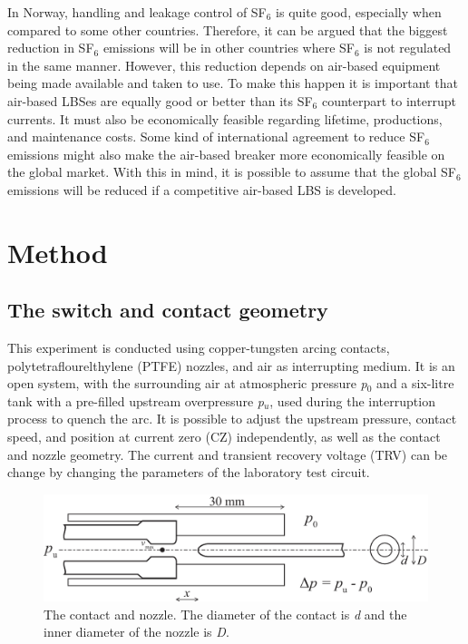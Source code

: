 \documentclass[10pt,a4paper,twoside]{article}
\begin{document}
In Norway, handling and leakage control of SF$_6$ is quite good, especially when compared to some other countries. Therefore, it can be argued that the biggest reduction in SF$_6$ emissions will be in other countries where SF$_6$ is not regulated in the same manner. However, this reduction depends on air-based equipment being made available and taken to use. To make this happen it is important that air-based LBSes are equally good or better than its SF$_6$ counterpart to interrupt currents. It must also be economically feasible regarding lifetime, productions, and maintenance costs. Some kind of international agreement to reduce SF$_6$ emissions might also make the air-based breaker more economically feasible on the global market. With this in mind, it is possible to assume that the global SF$_6$ emissions will be reduced if a competitive air-based LBS is developed.

\cleardoublepage

\section{Method} \label{sec:Method}

\subsection{The switch and contact geometry} \label{sec:switchAndContactGeo}

This experiment is conducted using copper-tungsten arcing contacts, polytetraflourelthylene (PTFE) nozzles, and air as interrupting medium. It is an open system, with the surrounding air at atmospheric pressure \textit{p$_0$} and a six-litre tank with a pre-filled upstream overpressure \textit{p$_u$}, used during the interruption process to quench the arc. It is possible to adjust the upstream pressure, contact speed, and position at current zero (CZ) independently, as well as the contact and nozzle geometry. The current and transient recovery voltage (TRV) can be change by changing the parameters of the laboratory test circuit.

\begin{figure} [h]
\centering
\includegraphics[scale=0.3]{Bilder/Method/contactSetUpVmax3.png}
\caption{The contact and nozzle. The diameter of the contact is \textit{d} and the inner diameter of the nozzle is \textit{D}.} \label{fig:contactAndNozzle}
\end{figure}
\end{document}

